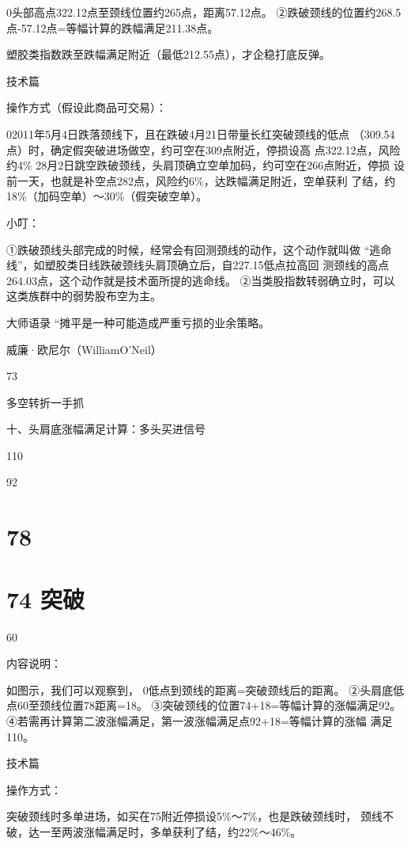 \documentclass{article}
\begin{document}
0头部高点322.12点至颈线位置约265点，距离57.12点。 ②跌破颈线的位置约268.5点-57.12点=等幅计算的跌幅满足211.38点。

塑胶类指数跌至跌幅满足附近（最低212.55点），才企稳打底反弹。

\clearpage

技术篇

操作方式（假设此商品可交易）：

02011年5月4日跌落颈线下，且在跌破4月21日带量长红突破颈线的低点 （309.54点）时，确定假突破进场做空，约可空在309点附近，停损设高 点322.12点，风险约4\% 28月2日跳空跌破颈线，头肩顶确立空单加码，约可空在266点附近，停损 设前一天，也就是补空点282点，风险约6\%，达跌幅满足附近，空单获利 了结，约18\%（加码空单）～30\%（假突破空单）。

小叮：

①跌破颈线头部完成的时候，经常会有回测颈线的动作，这个动作就叫做 “逃命线”，如塑胶类日线跌破颈线头肩顶确立后，自227.15低点拉高回 测颈线的高点264.03点，这个动作就是技术面所提的逃命线。 ②当类股指数转弱确立时，可以这类族群中的弱势股布空为主。

大师语录 “摊平是一种可能造成严重亏损的业余策略。

威廉·欧尼尔（WilliamO'Neil）

73

\clearpage

多空转折一手抓

十、头肩底涨幅满足计算：多头买进信号

110

92

\section{78}

\section{74 突破}

60

内容说明：

如图示，我们可以观察到， 0低点到颈线的距离=突破颈线后的距离。 ②头肩底低点60至颈线位置78距离=18。 ③突破颈线的位置74+18=等幅计算的涨幅满足92。 ④若需再计算第二波涨幅满足，第一波涨幅满足点92+18=等幅计算的涨幅 满足110。

\clearpage

技术篇

操作方式：

突破颈线时多单进场，如买在75附近停损设5\%～7\%，也是跌破颈线时， 颈线不破，达一至两波涨幅满足时，多单获利了结，约22\%～46\%。
\end{document}
